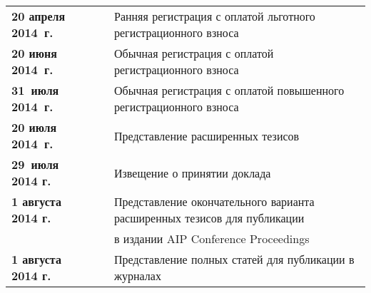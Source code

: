 \vspace*{6pt}

{\tabcolsep=0pt 
\begin{tabular}{lp{1mm}l} 

\textbf{20 апреля 2014~г.} &\ & Ранняя 
регистрация с оплатой льготного регистрационного взноса\\

\textbf{20 июня 2014~г.} &\ & Обычная регистрация с оплатой регистрационного 
взноса\\

\textbf{31~июля 2014~г.}&\ & Обычная регистрация с оплатой повышенного 
регистрационного взноса\\

\textbf{20 июля 2014~г.}&\ & Представление расширенных тезисов\\

\textbf{29~июля 2014 г.}&\ & Извещение о принятии доклада \\

\textbf{1 августа 2014 г.}&\ & Представление окончательного варианта 
расширенных 
тезисов для публикации\\
&& в издании AIP Conference Proceedings \\

\textbf{1 августа 2014 г.}&\ & Представление полных статей для публикации в 
журналах 
\end{tabular}}
   \thispagestyle{empty}